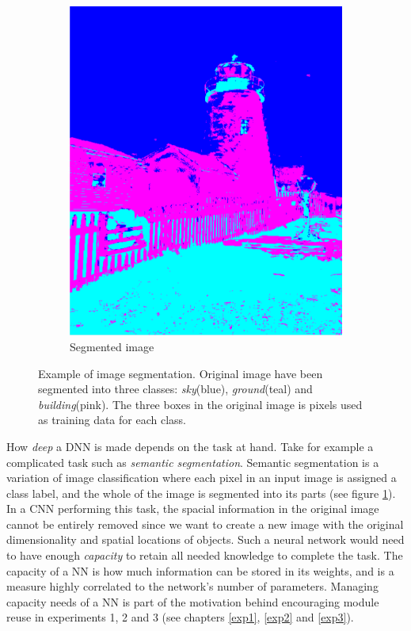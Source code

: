 \begin{figure}
\begin{subfigure}[h]{0.49\linewidth}
        \includegraphics[width=\linewidth]{Chapters/2.Background/figures/segmentation.png}
        \caption{Segmented image}
    \end{subfigure}
    \caption[Image segmentation]{Example of image segmentation. Original image have been segmented into three classes: \textit{sky}(blue), \textit{ground}(teal) and \textit{building}(pink). The three boxes in the original image is pixels used as training data for each class.}
    \label{fig:semanticsegmentation}
\end{figure}

How \textit{deep} a DNN is made depends on the task at hand. Take for example a complicated task such as \textit{semantic segmentation}. Semantic segmentation is a variation of image classification where each pixel in an input image is assigned a class label, and the whole of the image is segmented into its parts (see figure \ref{fig:semanticsegmentation}). In a CNN performing this task, the spacial information in the original image cannot be entirely removed since we want to create a new image with the original dimensionality and spatial locations of objects. Such a neural network would need to have enough \textit{capacity} to retain all needed knowledge to complete the task. The capacity of a NN is how much information can be stored in its weights, and is a measure highly correlated to the network's number of parameters. Managing capacity needs of a NN is part of the motivation behind encouraging module reuse in experiments 1, 2 and 3 (see chapters \ref{exp1}, \ref{exp2} and \ref{exp3}).

